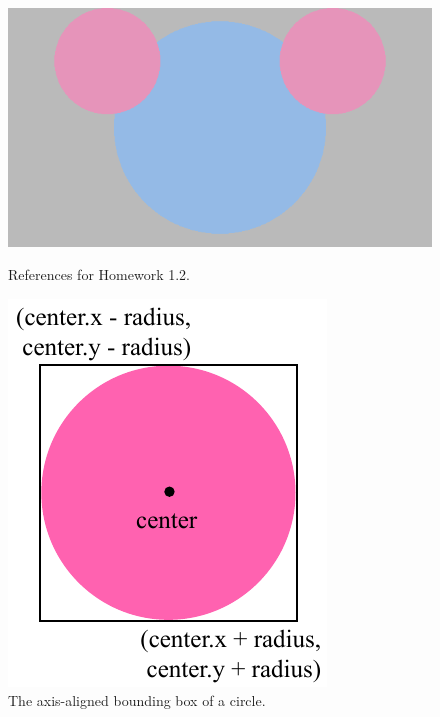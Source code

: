\begin{figure}[ht]
    \begin{minipage}{0.67\linewidth}
    \centering
    \includegraphics[width=\linewidth]{imgs/hw_1_2.png}
    \caption{References for Homework 1.2.}
    \label{fig:hw1_2}
    \end{minipage}
    \begin{minipage}{0.32\linewidth}
    \centering
    \includegraphics[width=\linewidth]{imgs/circle_box.pdf}
    \caption{The axis-aligned bounding box of a circle.}
    \label{fig:circle_box}
    \end{minipage}
\end{figure}


